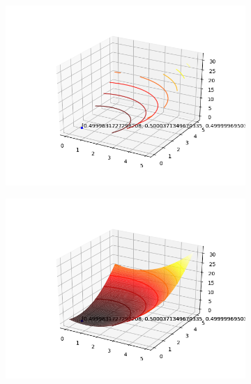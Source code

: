 \documentclass[a4paper, 12pt]{article}
\begin{document}
\begin{figure}[H]
\centering
\begin{subfigure}{0.3\textwidth}
  \centering
  \includegraphics[width=\linewidth]{1/A/RP10/contorno.png}
\end{subfigure}%
\begin{subfigure}{0.3\textwidth}
  \centering
  \includegraphics[width=\linewidth]{1/A/RP10/superficie.png}
\end{subfigure}
\begin{subfigure}{0.3\textwidth}
  \centering

\end{subfigure}
\end{figure}
\end{document}
